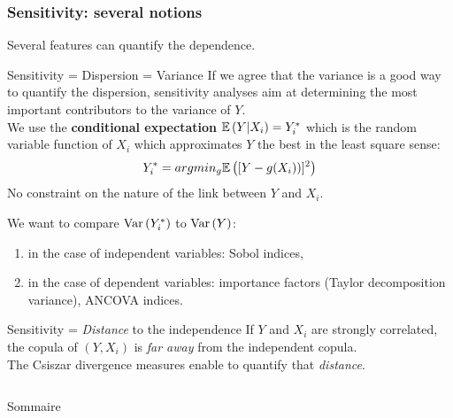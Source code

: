 \documentclass[8pt]{beamer}
\begin{document}
\begin{frame}
\frametitle{Sensitivity: several notions}
\small

Several features can quantify the dependence.

\begin{block}{Sensitivity = Dispersion = Variance}
If we agree that  the \alert{variance is a good way to quantify the dispersion}, sensitivity analyses aim at determining the most important contributors to the variance of $Y$. \\
We use the {\bf conditional expectation}  $\mathbb{E}\left( Y|X_i \right) = Y^*_i$ which is the random variable function of $X_i$ which approximates $Y$ the best  in the least square sense: 
\begin{align*}
Y^*_i = argmin_{g} \mathbb{E}\left( [Y-g(X_i))]^2 \right)
\end{align*}
No constraint on the nature of the link between $Y$ and $X_i$.\\
\vspace*{0.1cm}

We want to compare  \alert{$\mbox{Var}\left( Y^*_i \right)$} to \alert{$\mbox{Var}\left( Y \right)$}:
 \begin{enumerate}
  \item in the case of independent variables: \alert{Sobol indices},
  \item in the case of dependent variables: importance factors (\alert{Taylor decomposition variance}), \alert{ANCOVA indices}.
 \end{enumerate}
\end{block}

\begin{block}{Sensitivity = \emph{Distance} to the independence}
 If $Y$ and $X_i$ are strongly correlated, the  copula of $(Y,X_i)$ is \emph{far away} from the independent copula.\\
 The \alert{Csiszar divergence measures} enable to quantify that \emph{distance}.
\end{block}

\end{frame}



\begin{frame}
  \begin{columns}

    {\huge{Sommaire}}
    \vspace{1cm}
    \small{\tableofcontents}
  \end{columns}
\end{frame}
\end{document}
